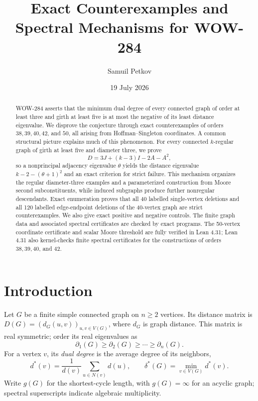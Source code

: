 \documentclass[a4paper,11pt,reqno]{amsart}
\title[Exact counterexamples to WOW-284]
{Exact Counterexamples and Spectral Mechanisms for WOW-284}
\author{Samuil Petkov}
\date{19 July 2026}
\theoremstyle{plain}
\theoremstyle{definition}
\theoremstyle{remark}
\begin{document}
\begin{abstract}
WOW-284 asserts that the minimum dual degree of every connected graph of
order at least three and girth at least five is at most the negative of its
least distance eigenvalue.  We disprove the conjecture through exact
counterexamples of orders \(38,39,40,42\), and \(50\), all arising from
Hoffman--Singleton coordinates.  A common structural picture explains much
of this phenomenon.  For every connected \(k\)-regular graph of girth at least
five and diameter three, we prove
\[
 D=3J+(k-3)I-2A-A^2,
\]
so a nonprincipal adjacency eigenvalue \(\theta\) yields the distance
eigenvalue \(k-2-(\theta+1)^2\) and an exact criterion for strict failure.
This mechanism organizes the regular diameter-three examples and a
parameterized construction from Moore second subconstituents, while induced
subgraphs produce further nonregular descendants.  Exact enumeration proves
that all 40 labelled single-vertex deletions and all 120 labelled
edge-endpoint deletions of the 40-vertex graph are strict counterexamples.
We also give exact positive and negative controls.  The finite graph data and
associated spectral certificates are checked by exact programs.  The
50-vertex coordinate certificate and scalar Moore threshold are fully verified
in Lean 4.31; Lean 4.31 also kernel-checks finite spectral certificates for
the constructions of orders \(38,39,40\), and \(42\).
\end{abstract}

\maketitle

\section*{Introduction}

Let \(G\) be a finite simple connected graph on \(n\ge2\) vertices.  Its
distance matrix is \(D(G)=(d_G(u,v))_{u,v\in V(G)}\), where \(d_G\) is graph
distance.  This matrix is real symmetric; order its real eigenvalues as
\[
  \partial_1(G)\ge \partial_2(G)\ge\cdots\ge\partial_n(G).
\]
For a vertex \(v\), its \emph{dual degree} is the average degree of its
neighbors,
\[
  d^*(v)=\frac{1}{d(v)}\sum_{u\in N(v)}d(u),
  \qquad
  \delta^*(G)=\min_{v\in V(G)}d^*(v).
\]
Write \(g(G)\) for the shortest-cycle length, with \(g(G)=\infty\) for an
acyclic graph; spectral superscripts indicate algebraic multiplicity.
\end{document}
